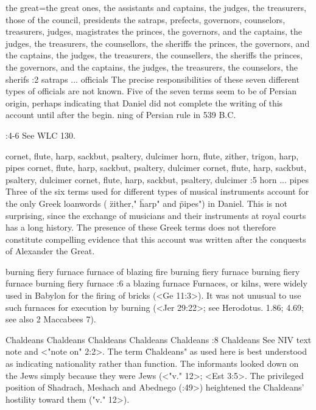     {the great}={the great ones, the assistants and captains, the judges, the treasurers, those of the council, presidents} %
    {the satraps, prefects, governors, counselors, treasurers, judges, magistrates} %
    {the princes, the governors, and the captains, the judges, the treasurers, the counsellors, the sheriffs} %
    {the princes, the governors, and the captains, the judges, the treasurers, the counsellers, the sheriffs} %
    {the princes, the governors, and the captains, the judges, the treasurers, the counselors, the sherifs} %
:2 {satraps ... officials} The precise responsibilities of these seven different types of officials
are not known. Five of the seven  terms seem to be of Persian origin, perhaps indicating that Daniel 
did not complete the writing of this account until after the begin. 
ning of Persian rule in 539 B.C.

:4-6 {}  See WLC 130.

    {cornet, flute, harp, sackbut, psaltery, dulcimer} %
    {horn, flute, zither, trigon, harp, pipes} %
    {cornet, flute, harp, sackbut, psaltery, dulcimer} %
    {cornet, flute, harp, sackbut, psaltery, dulcimer} %
    {cornet, flute, harp, sackbut, psaltery, dulcimer} %
:5 {horn ... pipes} Three of the six terms used for different types 
of musical instruments account for the only Greek loanwords 
( \"zither," \"harp" and \"pipes") in Daniel. This is not surprising, since 
the exchange of musicians and their instruments at royal courts 
has a long history. The presence of these Greek terms does not 
therefore constitute compelling evidence that this account was 
written after the conquests of Alexander the Great.

    {burning fiery furnace} %
    {furnace of blazing fire} %
    {burning fiery furnace} %
    {burning fiery furnace} %
    {burning fiery furnace} %
:6 {a blazing furnace} Furnaces, or kilns, were widely used in 
Babylon for the firing of bricks (<Ge 11:3>). It was not unusual to use 
such furnaces for execution by burning (<Jer 29:22>; see Herodotus. 
1.86; 4.69; see also 2 Maccabees 7).


    {Chaldeans} %
    {Chaldeans} %
    {Chaldeans} %
    {Chaldeans} %
    {Chaldeans} %
:8 {Chaldeans} See NIV text note and <"note on" 2:2>. The term 
 \"Chaldeans" as used here is best understood as indicating nationality rather than function. The
informants looked down on the  
Jews simply because they were Jews (<"v." 12>; <Est 3:5>. The privileged position of Shadrach, Meshach and
Abednego (:49>) heightened the Chaldeans' hostility toward them (\<"v." 12>). 

